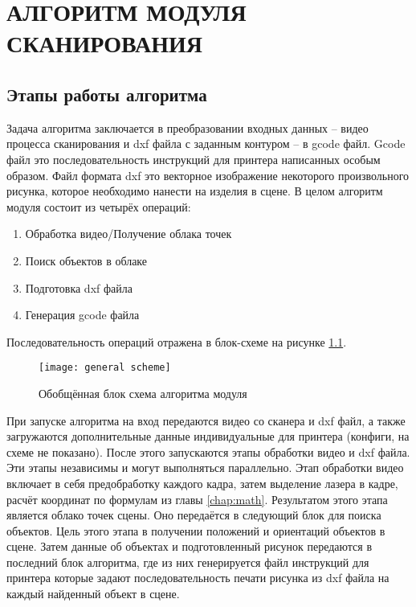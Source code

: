 \chapter{АЛГОРИТМ МОДУЛЯ СКАНИРОВАНИЯ}\label{chap:algorithms}
    \section{Этапы работы алгоритма}
        Задача алгоритма заключается в преобразовании входных данных -- видео процесса сканирования и dxf файла с заданным контуром -- в gcode файл. Gcode файл это последовательность инструкций для принтера написанных особым образом. Файл формата dxf это векторное изображение некоторого произвольного рисунка, которое необходимо нанести на изделия в сцене.
        В целом алгоритм модуля состоит из четырёх операций:
        \begin{enumerate}
            \item Обработка видео/Получение облака точек
            \item Поиск объектов в облаке
            \item Подготовка dxf файла
            \item Генерация gcode файла
        \end{enumerate}
        
        Последовательность операций отражена в блок-схеме на рисунке \ref{pic:general_scheme}.
        \begin{figure}[h]
            \centering
            \texttt{[image: general scheme]}
            \caption{Обобщённая блок схема алгоритма модуля}
            \label{pic:general_scheme}
        \end{figure}
         При запуске алгоритма на вход передаются видео со сканера и dxf файл, а также загружаются дополнительные данные индивидуальные для принтера (конфиги, на схеме не показано). После этого запускаются этапы обработки видео и dxf файла. Эти этапы независимы и могут выполняться параллельно. Этап обработки видео включает в себя предобработку каждого кадра, затем выделение лазера в кадре, расчёт координат по формулам из главы \ref{chap:math}. Результатом этого этапа является облако точек сцены. Оно передаётся в следующий блок для поиска объектов. Цель этого этапа в получении положений и ориентаций объектов в сцене. Затем данные об объектах и подготовленный рисунок передаются в последний блок алгоритма, где из них генерируется файл инструкций для принтера которые задают последовательность печати рисунка из dxf файла на каждый найденный объект в сцене.
